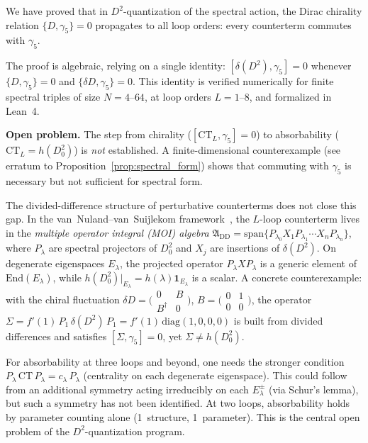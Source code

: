 \documentclass[12pt,a4paper]{article}
\theoremstyle{definition}
\theoremstyle{remark}
\begin{document}
We have proved that in $D^2$-quantization of the spectral action, the Dirac
chirality relation $\{D, \gamma_5\} = 0$ propagates to all loop orders:
every counterterm commutes with $\gamma_5$.

The proof is algebraic, relying on a single identity:
$[\delta(D^2), \gamma_5] = 0$ whenever $\{D, \gamma_5\} = 0$ and
$\{\delta D, \gamma_5\} = 0$.  This identity is verified numerically for
finite spectral triples of size $N = 4$--$64$, at loop orders $L = 1$--$8$,
and formalized in Lean~4.

\textbf{Open problem.}  The step from chirality ($[\mathrm{CT}_L, \gamma_5] = 0$)
to absorbability ($\mathrm{CT}_L = h(D_0^2)$) is \emph{not}
established. A finite-dimensional counterexample (see erratum to
Proposition~\ref{prop:spectral_form}) shows that commuting with $\gamma_5$ is
necessary but not sufficient for spectral form.

The divided-difference structure of perturbative counterterms does not close
this gap. In the van~Nuland--van~Suijlekom
framework~\cite{vanNuland:2021oneloop}, the $L$-loop counterterm lives in the
\emph{multiple operator integral (MOI) algebra}
$\mathfrak{A}_{\mathrm{DD}} = \mathrm{span}\{P_{\lambda_0} X_1 P_{\lambda_1}
\cdots X_n P_{\lambda_n}\}$, where $P_\lambda$ are spectral projectors of
$D_0^2$ and $X_j$ are insertions of $\delta(D^2)$. On degenerate eigenspaces
$E_\lambda$, the projected operator $P_\lambda X P_\lambda$ is a generic
element of $\mathrm{End}(E_\lambda)$, while $h(D_0^2)|_{E_\lambda}
= h(\lambda)\mathbf{1}_{E_\lambda}$ is a scalar. A concrete counterexample:
with the chiral fluctuation $\delta D = \bigl(\begin{smallmatrix} 0 & B \\
B^\dagger & 0 \end{smallmatrix}\bigr)$, $B = \bigl(\begin{smallmatrix} 0 & 1
\\ 0 & 0 \end{smallmatrix}\bigr)$, the operator
$\Sigma = f'(1)\,P_1\,\delta(D^2)\,P_1 = f'(1)\,\mathrm{diag}(1,0,0,0)$
is built from divided differences and satisfies $[\Sigma, \gamma_5] = 0$,
yet $\Sigma \neq h(D_0^2)$.

For absorbability at three loops and beyond, one needs the stronger condition
$P_\lambda\,\mathrm{CT}\,P_\lambda = c_\lambda\,P_\lambda$ (centrality on
each degenerate eigenspace). This could follow from an additional symmetry
acting irreducibly on each $E_\lambda^\pm$ (via Schur's lemma), but such a
symmetry has not been identified. At two loops, absorbability holds by
parameter counting alone (1~structure, 1~parameter).
This is the central open problem of the $D^2$-quantization program.
\end{document}
